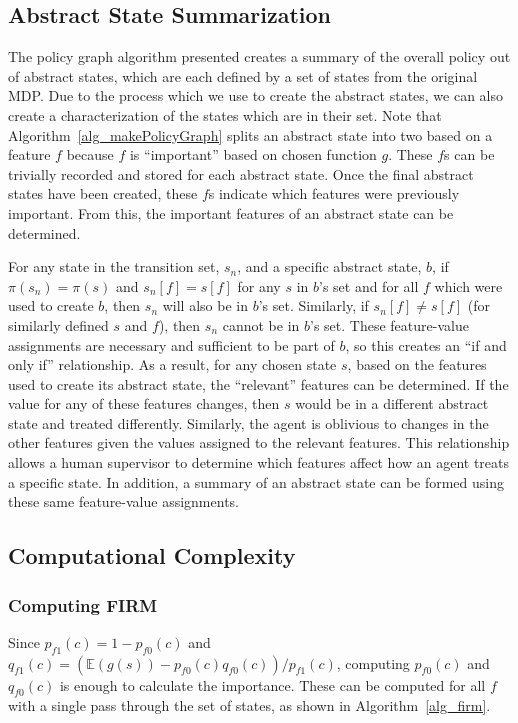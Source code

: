 \documentclass[letterpaper]{article} %
\begin{document}
\subsection{Abstract State Summarization} \label{approach_abstractStateSummarization}
The policy graph algorithm presented creates a summary of the overall policy out of abstract states, which are each defined by a set of states from the original MDP. Due to the process which we use to create the abstract states, we can also create a characterization of the states which are in their set. Note that Algorithm~\ref{alg_makePolicyGraph} splits an abstract state into two based on a feature $f$ because $f$ is ``important'' based on chosen function $g$. These $f$s can be trivially recorded and stored for each abstract state. Once the final abstract states have been created, these $f$s indicate which features were previously important. From this, the important features of an abstract state can be determined.

For any state in the transition set, $s_n$, and a specific abstract state, $b$, if $\pi(s_n) = \pi(s)$ and $s_n[f] = s[f]$ for any $s$ in $b$'s set and for all $f$ which were used to create $b$, then $s_n$ will also be in $b$'s set. Similarly, if $s_n[f] \neq s[f]$ (for similarly defined $s$ and $f$), then $s_n$ cannot be in $b$'s set. These feature-value assignments are necessary and sufficient to be part of $b$, so this creates an ``if and only if'' relationship. As a result, for any chosen state $s$, based on the features used to create its abstract state, the ``relevant'' features can be determined.
If the value for any of these features changes, then $s$ would be in a different abstract state and treated differently. Similarly, the agent is oblivious to changes in the other features given the values assigned to the relevant features. This relationship allows a human supervisor to determine which features affect how an agent treats a specific state. In addition, a summary of an abstract state can be formed using these same feature-value assignments.

\subsection{Computational Complexity}
\label{approach_computationalComplexity}

\subsubsection{Computing FIRM}
Since $p_{f1}(c) = 1 - p_{f0}(c)$ and $q_{f1}(c) = (\mathbb{E}(g(s)) - p_{f0}(c) q_{f0}(c)) / p_{f1}(c)$, computing $p_{f0}(c)$ and $q_{f0}(c)$ is enough to calculate the importance. These can be computed for all $f$ with a single pass through the set of states, as shown in Algorithm~\ref{alg_firm}.
\end{document}
